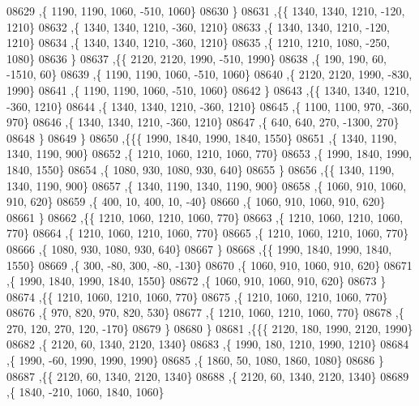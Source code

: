\begin{DoxyCode}
08629     ,\{  1190,  1190,  1060,  -510,  1060\}
08630     \}
08631    ,\{\{  1340,  1340,  1210,  -120,  1210\}
08632     ,\{  1340,  1340,  1210,  -360,  1210\}
08633     ,\{  1340,  1340,  1210,  -120,  1210\}
08634     ,\{  1340,  1340,  1210,  -360,  1210\}
08635     ,\{  1210,  1210,  1080,  -250,  1080\}
08636     \}
08637    ,\{\{  2120,  2120,  1990,  -510,  1990\}
08638     ,\{   190,   190,    60, -1510,    60\}
08639     ,\{  1190,  1190,  1060,  -510,  1060\}
08640     ,\{  2120,  2120,  1990,  -830,  1990\}
08641     ,\{  1190,  1190,  1060,  -510,  1060\}
08642     \}
08643    ,\{\{  1340,  1340,  1210,  -360,  1210\}
08644     ,\{  1340,  1340,  1210,  -360,  1210\}
08645     ,\{  1100,  1100,   970,  -360,   970\}
08646     ,\{  1340,  1340,  1210,  -360,  1210\}
08647     ,\{   640,   640,   270, -1300,   270\}
08648     \}
08649    \}
08650   ,\{\{\{  1990,  1840,  1990,  1840,  1550\}
08651     ,\{  1340,  1190,  1340,  1190,   900\}
08652     ,\{  1210,  1060,  1210,  1060,   770\}
08653     ,\{  1990,  1840,  1990,  1840,  1550\}
08654     ,\{  1080,   930,  1080,   930,   640\}
08655     \}
08656    ,\{\{  1340,  1190,  1340,  1190,   900\}
08657     ,\{  1340,  1190,  1340,  1190,   900\}
08658     ,\{  1060,   910,  1060,   910,   620\}
08659     ,\{   400,    10,   400,    10,   -40\}
08660     ,\{  1060,   910,  1060,   910,   620\}
08661     \}
08662    ,\{\{  1210,  1060,  1210,  1060,   770\}
08663     ,\{  1210,  1060,  1210,  1060,   770\}
08664     ,\{  1210,  1060,  1210,  1060,   770\}
08665     ,\{  1210,  1060,  1210,  1060,   770\}
08666     ,\{  1080,   930,  1080,   930,   640\}
08667     \}
08668    ,\{\{  1990,  1840,  1990,  1840,  1550\}
08669     ,\{   300,   -80,   300,   -80,  -130\}
08670     ,\{  1060,   910,  1060,   910,   620\}
08671     ,\{  1990,  1840,  1990,  1840,  1550\}
08672     ,\{  1060,   910,  1060,   910,   620\}
08673     \}
08674    ,\{\{  1210,  1060,  1210,  1060,   770\}
08675     ,\{  1210,  1060,  1210,  1060,   770\}
08676     ,\{   970,   820,   970,   820,   530\}
08677     ,\{  1210,  1060,  1210,  1060,   770\}
08678     ,\{   270,   120,   270,   120,  -170\}
08679     \}
08680    \}
08681   ,\{\{\{  2120,   180,  1990,  2120,  1990\}
08682     ,\{  2120,    60,  1340,  2120,  1340\}
08683     ,\{  1990,   180,  1210,  1990,  1210\}
08684     ,\{  1990,   -60,  1990,  1990,  1990\}
08685     ,\{  1860,    50,  1080,  1860,  1080\}
08686     \}
08687    ,\{\{  2120,    60,  1340,  2120,  1340\}
08688     ,\{  2120,    60,  1340,  2120,  1340\}
08689     ,\{  1840,  -210,  1060,  1840,  1060\}

\end{DoxyCode}
